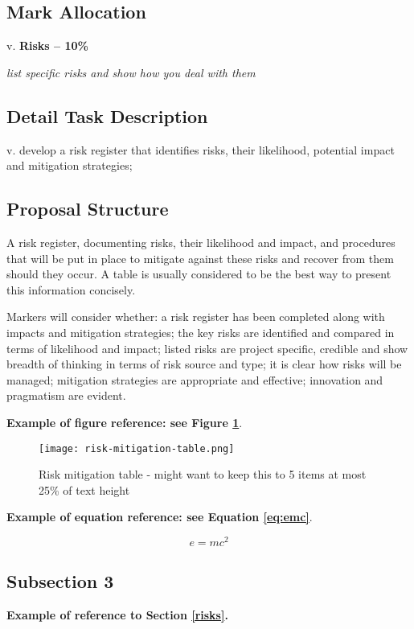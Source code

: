 \subsection{Mark Allocation}

v. \textbf{Risks -- 10\%}

\textit{list specific risks and show how you deal with them}

\subsection{Detail Task Description} 

v. develop a risk register that identifies risks, their likelihood, potential impact and mitigation strategies;

\subsection{Proposal Structure}

A risk register, documenting risks, their likelihood and impact, and procedures that will be put in place to mitigate against these risks and recover from them should they occur. A table is usually considered to be the best way to present this information concisely.

Markers will consider whether: a risk register has been completed along with impacts and mitigation strategies; the key risks are identified and compared in terms of likelihood and impact; listed risks are project specific, credible and show breadth of thinking in terms of risk source and type; it is clear how risks will be managed; mitigation strategies are appropriate and effective; innovation and pragmatism are evident.



\textbf{Example of figure reference: see Figure \ref{fig:example}}. 
\lipsum[5]

\begin{figure}[h]
\centering\texttt{[image: risk-mitigation-table.png]}
\caption{Risk mitigation table - might want to keep this to 5 items at most ~ 25\% of text height}
\label{fig:example}
\end{figure}

\textbf{Example of equation reference: see Equation \eqref{eq:emc}}. 
\lipsum[6]

\begin{equation} 
\label{eq:emc}
e = mc^2
\end{equation}

\subsection{Subsection 3}

\textbf{Example of reference to Section \ref{risks}.} 
\lipsum[7]
\lipsum[8]